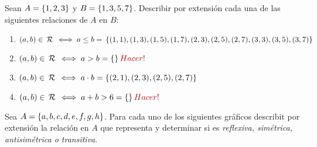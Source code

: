 \ejercicio Sean $A = \left\{ 1, 2, 3 \right\}$ y $B = \left\{ 1, 3, 5, 7 \right\}$. Describir por extensión cada una de las
siguientes relaciones de $A$ en $B$:
\begin{enumerate}[label=\roman*)]
	\item $(a,b) \in \,\mathcal{R}\, \iff a\leq b =\\
		      \left\{ (1,1), (1,3), (1,5), (1,7), (2,3), (2,5), (2,7), (3,3), (3,5), (3,7) \right\}$

	\item $(a,b) \en \relacion \sisolosi a > b = \set{}\hacer$

	\item $(a,b) \in \,\mathcal{R}\, \iff a \cdot b = \left\{ (2,1), (2,3), (2,5), (2,7) \right\}$

	\item $(a,b) \en \relacion \sisolosi a + b > 6 = \set{}\hacer$
\end{enumerate}
\ejercicio Sea $A = \left\{ a,b,c,d,e,f,g,h \right\}$. Para cada uno de los siguientes gráficos describit por
extensión la relación en $A$ que representa y determinar si es \textit{reflexiva, simétrica, antisimétrica o transitiva}.
